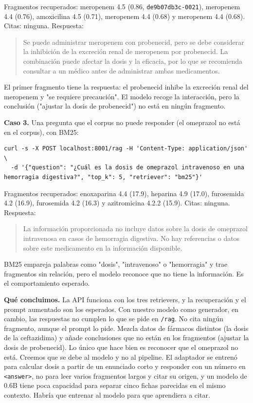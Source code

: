 Fragmentos recuperados: meropenem 4.5 (0.86, \texttt{de9b07db3c-0021}), meropenem 4.4 (0.76),
amoxicilina 4.5 (0.71), meropenem 4.4 (0.68) y meropenem 4.4 (0.68). Citas: ninguna. Respuesta:

\begin{quote}
Se puede administrar meropenem con probenecid, pero se debe considerar la inhibición de la
excreción renal de meropenem por probenecid. La combinación puede afectar la dosis y la
eficacia, por lo que se recomienda consultar a un médico antes de administrar ambas medicamentos.
\end{quote}

El primer fragmento tiene la respuesta: el probenecid inhibe la excreción renal del meropenem y
"se requiere precaución". El modelo recoge la interacción, pero la conclusión ("ajustar la dosis
de probenecid") no está en ningún fragmento.

\textbf{Caso 3.} Una pregunta que el corpus no puede responder (el omeprazol no está en el corpus),
con BM25:

\begin{lstlisting}
curl -s -X POST localhost:8001/rag -H 'Content-Type: application/json' \
  -d '{"question": "¿Cuál es la dosis de omeprazol intravenoso en una hemorragia digestiva?", "top_k": 5, "retriever": "bm25"}'
\end{lstlisting}

Fragmentos recuperados: enoxaparina 4.4 (17.9), heparina 4.9 (17.0), furosemida 4.2 (16.9),
furosemida 4.2 (16.3) y azitromicina 4.2.2 (15.9). Citas: ninguna. Respuesta:

\begin{quote}
La información proporcionada no incluye datos sobre la dosis de omeprazol intravenosa en casos
de hemorragia digestiva. No hay referencias o datos sobre este medicamento en la información disponible.
\end{quote}

BM25 empareja palabras como "dosis", "intravenoso" o "hemorragia" y trae fragmentos sin relación,
pero el modelo reconoce que no tiene la información. Es el comportamiento esperado.

\textbf{Qué concluimos.} La API funciona con los tres retrievers, y la recuperación y el prompt
aumentado son los esperados. Con nuestro modelo como generador, en cambio, las respuestas no
cumplen lo que se pide en \texttt{/\allowbreak{}rag}. No cita ningún fragmento, aunque el prompt lo pide. Mezcla
datos de fármacos distintos (la dosis de la ceftazidima) y añade conclusiones que no están en
los fragmentos (ajustar la dosis de probenecid). Lo único que hace bien es reconocer que el
omeprazol no está. Creemos que se debe al modelo y no al pipeline. El adaptador se entrenó para
calcular dosis a partir de un enunciado corto y responder con un número en \texttt{\textless{}answer\textgreater{}}, no para
leer varios fragmentos largos y citar su origen, y un modelo de 0.6B tiene poca capacidad para
separar cinco fichas parecidas en el mismo contexto. Habría que entrenar al modelo para que
aprendiera a citar.

